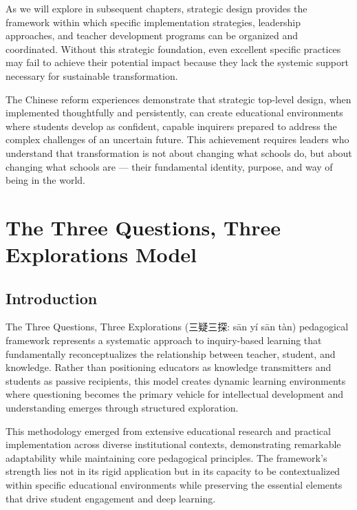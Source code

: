 \documentclass[
  Letterpaper,
]{scrbook}
\begin{document}
As we will explore in subsequent chapters, strategic design provides the
framework within which specific implementation strategies, leadership
approaches, and teacher development programs can be organized and
coordinated. Without this strategic foundation, even excellent specific
practices may fail to achieve their potential impact because they lack
the systemic support necessary for sustainable transformation.

The Chinese reform experiences demonstrate that strategic top-level
design, when implemented thoughtfully and persistently, can create
educational environments where students develop as confident, capable
inquirers prepared to address the complex challenges of an uncertain
future. This achievement requires leaders who understand that
transformation is not about changing what schools do, but about changing
what schools are --- their fundamental identity, purpose, and way of
being in the world.


\chapter{The Three Questions, Three Explorations
Model}\label{the-three-questions-three-explorations-model}

\section{Introduction}\label{introduction-2}

The Three Questions, Three Explorations (三疑三探: sān yí sān tàn)
pedagogical framework represents a systematic approach to inquiry-based
learning that fundamentally reconceptualizes the relationship between
teacher, student, and knowledge. Rather than positioning educators as
knowledge transmitters and students as passive recipients, this model
creates dynamic learning environments where questioning becomes the
primary vehicle for intellectual development and understanding emerges
through structured exploration.

This methodology emerged from extensive educational research and
practical implementation across diverse institutional contexts,
demonstrating remarkable adaptability while maintaining core pedagogical
principles. The framework's strength lies not in its rigid application
but in its capacity to be contextualized within specific educational
environments while preserving the essential elements that drive student
engagement and deep learning.
\end{document}
